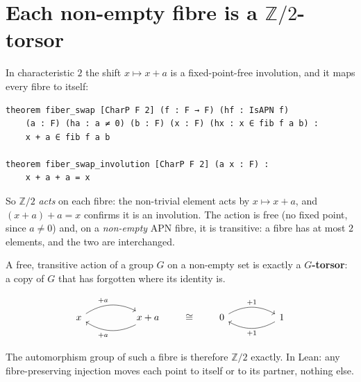 \documentclass[11pt]{article}
\begin{document}

\bigskip

\section{Each non-empty fibre is a $\mathbb{Z}/2$-torsor}

\noindent
In characteristic $2$ the shift $x\mapsto x+a$ is a fixed-point-free involution,
and it maps every fibre to itself:

\begin{lstlisting}
theorem fiber_swap [CharP F 2] (f : F → F) (hf : IsAPN f)
    (a : F) (ha : a ≠ 0) (b : F) (x : F) (hx : x ∈ fib f a b) :
    x + a ∈ fib f a b

theorem fiber_swap_involution [CharP F 2] (a x : F) :
    x + a + a = x
\end{lstlisting}

\noindent
So $\mathbb{Z}/2$ \emph{acts} on each fibre: the non-trivial element acts by
$x\mapsto x+a$, and $(x+a)+a=x$ confirms it is an involution. The action is
free (no fixed point, since $a\neq 0$) and, on a \emph{non-empty} APN fibre, it
is transitive: a fibre has at most $2$ elements, and the two are interchanged.

\medskip
\noindent
A free, transitive action of a group $G$ on a non-empty set is exactly a
\textbf{$G$-torsor}: a copy of $G$ that has forgotten where its identity is.

\[
\begin{tikzcd}[column sep=huge]
  x \arrow[r, bend left, "{+a}"] & x+a \arrow[l, bend left, "{+a}"]
\end{tikzcd}
\qquad\cong\qquad
\begin{tikzcd}[column sep=huge]
  0 \arrow[r, bend left, "{+1}"] & 1 \arrow[l, bend left, "{+1}"]
\end{tikzcd}
\]

\noindent
The automorphism group of such a fibre is therefore $\mathbb{Z}/2$ exactly. In
Lean: any fibre-preserving injection moves each point to itself or to its
partner, nothing else.
\end{document}

